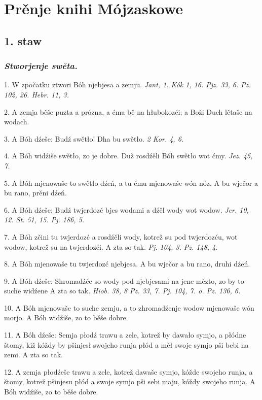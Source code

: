 \documentclass[twocolumn,b5paper]{book}
\begin{document}
\chapter*{Prěnje knihi Mójzaskowe}

\section*{1. staw}

\subsection*{\textit{Stworjenje swěta.}} 

1. W zpočatku ztwori Bóh njebjesa a zemju. \hfill {\footnotesize \textit{Jant, 1. Kók 1, 16. Pjz. 33, 6. Pz. 102, 26. Hebr. 11, 3.}}

2. A zemja běše puzta a prózna, a ćma bě na hłubokozći; a Boži Duch lětaše na wodach. 

3. A Bóh dźeše: Budź swětło! Dha bu swětło. \hfill {\footnotesize \textit{2 Kor. 4, 6.}}

4. A Bóh widźiše swětło, zo je dobre. Duž rosdźěli Bóh swětło wot ćmy. \hfill {\footnotesize \textit{Jez. 45, 7.}}

5. A Bóh mjenowaše to swětło dźeń, a tu ćmu mjenowaše wón nóz. A bu wječor a bu rano, prěni dźeń. 

6. A Bóh dźeše: Budź twjerdozć bjes wodami a dźěl wody wot wodow. \hfill {\footnotesize \textit{Jer. 10, 12. St. 51, 15. Pj. 186, 5.}}

7. A Bóh zčini tu twjerdozć a rosdźěli wody, kotrež su pod twjerdozću, wot wodow, kotrež su na twjerdozći. A zta so tak. \hfill {\footnotesize \textit{Pj. 104, 3. Pz. 148, 4.}}

8. A Bóh mjenowaše tu twjerdozć njebjesa. A bu wječor a bu rano, druhi dźeń. 

9. A Bóh dźeše: Shromadźće so wody pod njebjesami na jene mězto, zo by to suche widźene A zta so tak. \hfill {\footnotesize \textit{Hiob. 38, 8 Pz. 33, 7. Pj. 104, 7. o. Pz. 136, 6.}}

10. A Bóh mjenowaše to suche zemju, a to zhromadźenje wodow mjenowaše wón morjo. A Bóh widźiše, zo to běše dobre. 

11. A Bóh dźeše: Semja płodź trawu a zele, kotrež by dawało symjo, a płódne štomy, kiž kóždy by pšinjesł swojeho runja płód a měł swoje symjo pši bebi na zemi. A zta so tak. 

12. A zemja płodźeše trawu a zele, kotrež dawaše symjo, kóžde swojeho runja, a štomy, kotrež pšinjesu płód a swoje symjo pši sebi maju, kóždy swojeho runja. A Bóh widźiše, zo to běše dobre. 
\end{document}
